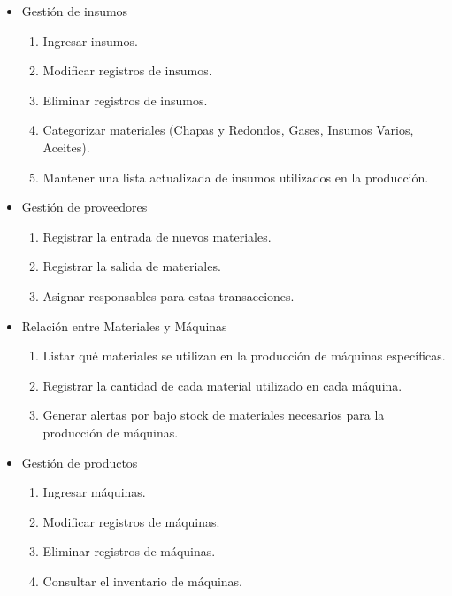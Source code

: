\documentclass{article}
\begin{document}
\begin{itemize}
	\item Gestión de insumos
	\begin{enumerate}[start=5]
		\item Ingresar insumos.
		\item Modificar registros de insumos.
		\item Eliminar registros de insumos.
		\item Categorizar materiales (Chapas y Redondos, Gases, Insumos Varios, Aceites).
		\item Mantener una lista actualizada de insumos utilizados en la producción.
	\end{enumerate}
\end{itemize}

\begin{itemize}
	\item Gestión de proveedores
	\begin{enumerate}[start=10]
		\item Registrar la entrada de nuevos materiales.
		\item Registrar la salida de materiales.
		\item Asignar responsables para estas transacciones.
	\end{enumerate}
\end{itemize}

\begin{itemize}
	\item Relación entre Materiales y Máquinas
	\begin{enumerate}[start=13]
		\item Listar qué materiales se utilizan en la producción de máquinas específicas.
		\item Registrar la cantidad de cada material utilizado en cada máquina.
		\item Generar alertas por bajo stock de materiales necesarios para la producción de máquinas.
	\end{enumerate}
\end{itemize}

\begin{itemize}
	\item Gestión de productos
	\begin{enumerate}[start=16]
		\item Ingresar máquinas.
		\item Modificar registros de máquinas.
		\item Eliminar registros de máquinas.
		\item Consultar el inventario de máquinas.
	\end{enumerate}
\end{itemize}
\end{document}

